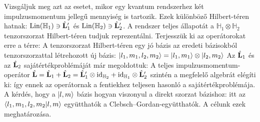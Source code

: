    Vizsgáljuk meg azt az esetet, mikor egy kvantum rendszerhez két impulzusmomentum jellegű mennyiség is tartozik. Ezek különböző Hilbert-téren hatnak: $\mathop{\mathrm{Lin}}\nolimits(\mathbb{H}_1)\ni\hat{\mathbf{L}}'_1$ és $\mathop{\mathrm{Lin}}\nolimits(\mathbb{H}_2)\ni\hat{\mathbf{L}}'_2$. A rendszer teljes állapotát a $\mathbb{H}_1\otimes\mathbb{H}_2$ tenzorszorzat Hilbert-téren tudjuk reprezentálni. Terjesszük ki az operátorokat erre a térre: 
   A tenzorszorzat Hilbert-téren egy jó bázis az eredeti bázisokból tenzorszorzattal létrehozott új bázis: $\lvert l_1,m_1,l_2,m_2\rangle=\lvert l_1,m_1\rangle\otimes\lvert l_2,m_2\rangle$
   Az $\hat{\mathbf{L}}_1$ és az $\hat{\mathbf{L}}_2$ sajátértékproblémáját már megoldottuk:
   A teljes impulzusmomentum-operátor $\hat{\mathbf{L}}=\hat{\mathbf{L}}_1+\hat{\mathbf{L}}_2=\hat{\mathbf{L}}_1'\otimes\text{id}_{\mathbb{H}_2}+\text{id}_{\mathbb{H}_1}\otimes\hat{\mathbf{L}}'_2$ szintén a megfelelő algebrát elégíti ki:
   így ennek az operátornak a fentiekhez teljesen hasonló a sajátértékproblémája. 
   A kérdés, hogy a $\lvert l,m\rangle$ bázis hogyan viszonyul a direkt szorzat bázishoz:
   itt az $\langle l_1,m_1,l_2,m_2\rvert l,m\rangle$ együtthatók a Clebsch--Gordan-együtthatók. A célunk ezek meghatározása. 
   
